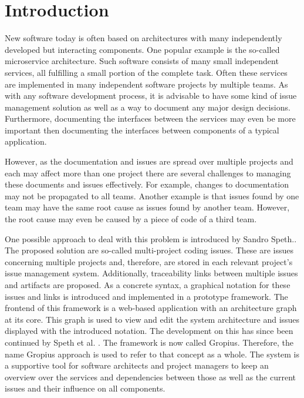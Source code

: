 
\chapter{Introduction}
\label{chap:ch1}
New software today is often based on architectures with many independently developed but interacting components.
One popular example is the so-called microservice architecture.
Such software consists of many small independent services, all fulfilling a small portion of the complete task.
Often these services are implemented in many independent software projects by multiple teams.
As with any software development process, it is advisable to have some kind of issue management solution 
as well as a way to document any major design decisions.
Furthermore, documenting the interfaces between the services may even be more important 
then documenting the interfaces between components of a typical application.

However, as the documentation and issues are spread over multiple projects
and each may affect more than one project there are several challenges to managing these documents and issues effectively.
For example, changes to documentation may not be propagated to all teams. 
Another example is that issues found by one team may have the same root cause as issues found by another team.
However, the root cause may even be caused by a piece of code of a third team.

One possible approach to deal with this problem is introduced by Sandro Speth.\cite{Speth2019}.
The proposed solution are so-called multi-project coding issues. 
These are issues concerning multiple projects and, therefore, are stored in each relevant project's issue management system. 
Additionally, traceability links between multiple issues and artifacts are proposed.
As a concrete syntax, a graphical notation for these issues and links is introduced and implemented in a prototype framework. 
The frontend of this framework is a web-based application with an architecture graph at its core.
This graph is used to view and edit the system architecture and issues displayed with the introduced notation.
The development on this has since been continued by Speth et al. \cite{speth2020gropius}. The framework is now called \gls{Gropius}.
Therefore, the name \gls{Gropius} approach is used to refer to that concept as a whole.
The system is a supportive tool for software architects and project managers to keep an overview over the services
and dependencies between those as well as the current issues and their influence on all components.

